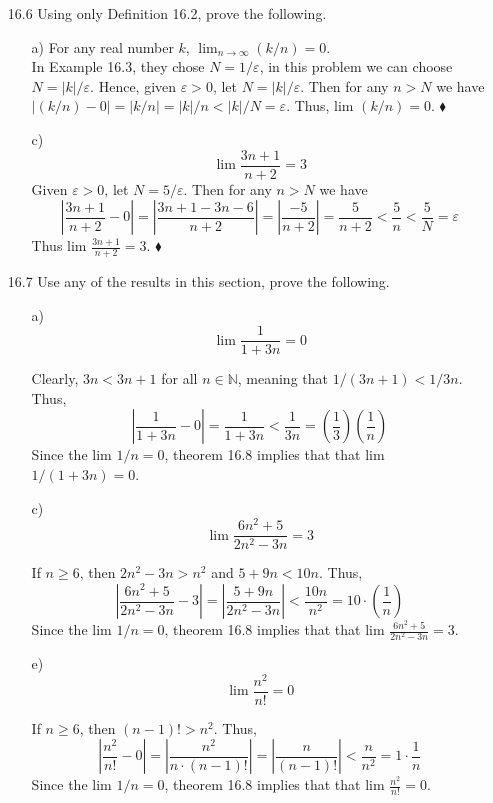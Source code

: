 \documentclass[12pt]{article}
\begin{document}
\begin{enumerate}
\item[16.6] Using only Definition 16.2, prove the following.
\begin{enumerate}
\item[a)] For any real number $k$, $\lim_{n \to \infty}(k/n) = 0$. \\
In Example 16.3, they chose $N = 1/\varepsilon$, in this problem we can choose $N = |k|/\varepsilon$. Hence, given $\varepsilon > 0$, let $N = |k|/\varepsilon$. Then for any $n > N$ we have
$|(k/n) - 0| = |k/n| = |k|/n < |k|/N = \varepsilon$. Thus, lim $(k/n) = 0$. $\blacklozenge$
\item[c)]
\[
\lim \frac{3n + 1}{n + 2} = 3
\]
Given $\varepsilon > 0$, let $N = 5/\varepsilon$. Then for any $n > N$ we have 
\[
\left| \frac{3n + 1}{n + 2} - 0 \right| = \left| \frac{3n + 1 - 3n - 6}{n + 2}\right|
= \left| \frac{-5}{n + 2} \right| = \frac{5}{n + 2} <  \frac{5}{n} < \frac{5}{N} = \varepsilon
\]
Thus lim $\frac{3n + 1}{n + 2} = 3$. $\blacklozenge$
\end{enumerate}

\item[16.7] Use any of the results in this section, prove the following.
\begin{enumerate}
\item[a)] 
\[
\lim \frac{1}{1 + 3n} = 0
\]

Clearly, $3n < 3n + 1$ for all $n \in \mathbb{N}$, meaning that $1/(3n + 1) < 1/3n$. Thus,
\[ 
\left| \frac{1}{1 + 3n} - 0 \right| = \frac{1}{1 + 3n} < \frac{1}{3n} = \left( \frac{1}{3} \right) 
\left( \frac{1}{n} \right)
\]
Since the lim $1/n = 0$, theorem 16.8 implies that that lim $1/(1 + 3n) = 0$.
\item[c)] 
\[
\lim \frac{6n^2 + 5}{2n^2 - 3n} = 3
\]

If $n \geq 6$, then $2n^2 - 3n > n^2$ and $5 + 9n < 10n$. Thus,
\[
\left| \frac{6n^2 + 5}{2n^2 - 3n} - 3 \right| = \left| \frac{5 + 9n}{2n^2 - 3n} \right| < 
\frac{10n}{n^2} = 10 \cdot \left( \frac{1}{n} \right) 
\]
Since the lim $1/n = 0$, theorem 16.8 implies that that lim $\frac{6n^2 + 5}{2n^2 - 3n} = 3$.

\item[e)] 
\[
\lim \frac{n^2}{n!} = 0
\]

If $n \geq 6$, then $(n - 1)! > n^2$. Thus, 
\[
\left| \frac{n^2}{n!} - 0 \right| = \left| \frac{n^2}{n \cdot (n - 1)!} \right| =
\left| \frac{n}{(n - 1)!} \right| < \frac{n}{n^2} = 1 \cdot \frac{1}{n}
\]
Since the lim $1/n = 0$, theorem 16.8 implies that that lim $\frac{n^2}{n!} = 0$.
\end{enumerate}


\end{enumerate}
\end{document}
